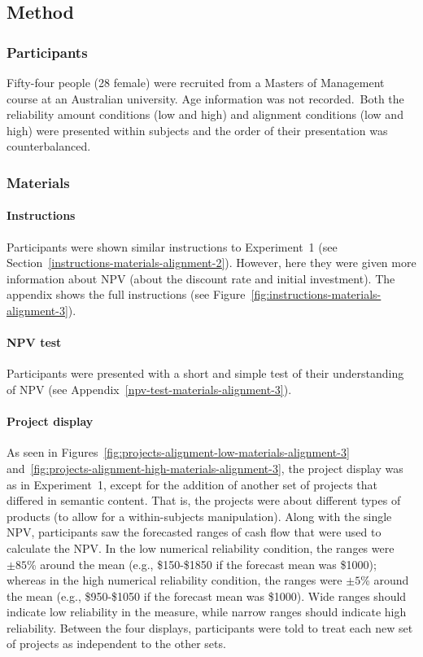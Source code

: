 \documentclass[a4paper, nobind, dvipsnames]{templates/ociamthesis}
\theoremstyle{definition}
\theoremstyle{definition}
\theoremstyle{definition}
\theoremstyle{definition}
\theoremstyle{remark}
\begin{document}
\subsection{Method}

\subsubsection{Participants}

Fifty-four people (28 female) were recruited from a Masters of Management course at an Australian university. Age information was not recorded.~Both the reliability amount conditions (low and
high) and alignment conditions (low and high) were presented within subjects and
the order of their presentation was counterbalanced.

\subsubsection{Materials}

\paragraph{Instructions}

Participants were shown similar instructions to Experiment~1 (see
Section~\ref{instructions-materials-alignment-2}). However, here they were
given more information about NPV (about the discount rate and initial
investment). The appendix shows the full instructions (see
Figure~\ref{fig:instructions-materials-alignment-3}).

\paragraph{NPV test}

Participants were presented with a short and simple test of their understanding
of NPV (see Appendix~\ref{npv-test-materials-alignment-3}).

\paragraph{Project display}

As seen in Figures~\ref{fig:projects-alignment-low-materials-alignment-3}
and~\ref{fig:projects-alignment-high-materials-alignment-3}, the project
display was as in Experiment~1, except for the addition of another set of
projects that differed in semantic content. That is, the projects were about
different types of products (to allow for a within-subjects manipulation). Along
with the single NPV, participants saw the forecasted ranges of cash flow that
were used to calculate the NPV. In the low numerical reliability condition, the
ranges were \(\pm85\)\% around the mean (e.g., \$150-\$1850 if the forecast mean was
\$1000); whereas in the high numerical reliability condition, the ranges were
\(\pm5\)\% around the mean (e.g., \$950-\$1050 if the forecast mean was \$1000). Wide
ranges should indicate low reliability in the measure, while narrow ranges
should indicate high reliability. Between the four displays, participants were
told to treat each new set of projects as independent to the other sets.
\end{document}
